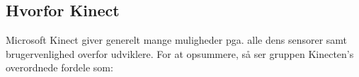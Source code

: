 %
%
%

\subsection{Hvorfor Kinect}\label{kinect:argumentation}
Microsoft Kinect giver generelt mange muligheder pga. alle dens sensorer samt brugervenlighed overfor udviklere.
For at opsummere, så ser gruppen Kinecten's overordnede fordele som:

